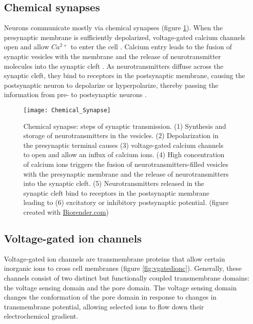\subsection{Chemical synapses}
Neurons communicate mostly via chemical synapses (figure  \ref{fig:chemicalsynapse}). When the presynaptic membrane is sufficiently depolarized, voltage-gated calcium channels open and allow $Ca^{2+}$ to enter the cell \parencite{Luo2020}. Calcium entry leads to the fusion of synaptic vesicles with the membrane and the release of neurotransmitter molecules into the synaptic cleft \parencite{Chapman2002}.  As neurotransmitters diffuse across the synaptic cleft, they bind to receptors in the postsynaptic membrane, causing the postsynaptic neuron to depolarize or hyperpolarize, thereby passing the information from pre- to postsynaptic neurons \parencite{Maio2008}. 

\begin{figure}
\centering
\hspace*{-1cm} 
\texttt{[image: Chemical\_Synapse]}
\caption[Chemical synapse: steps of synaptic transmission] {Chemical synapse: steps of synaptic transmission. (1) Synthesis and storage of neurotransmitters in the vesicles. (2) Depolarization in the presynaptic terminal causes (3) voltage-gated calcium channels to open and allow an influx of calcium ions. (4) High concentration of calcium ions triggers the fusion of neurotransmitters-filled vesicles with the presynaptic membrane and the release of neurotransmitters into the synaptic cleft. (5) Neurotransmitters released in the synaptic cleft bind to receptors in the postsynaptic membrane leading to (6) excitatory or inhibitory postsynaptic potential. (figure created with \href{https://app.biorender.com/biorender-templates}{Biorender.com})}
\label{fig:chemicalsynapse}
\end{figure}

\subsection{Voltage-gated ion channels}
Voltage-gated ion channels are transmembrane proteins that allow certain inorganic ions to cross cell membranes (figure  \ref{fig:vgatedionc}). Generally, these channels consist of two distinct but functionally coupled transmembrane domains: the voltage sensing domain and the pore domain. The voltage sensing domain changes the conformation of the pore domain in response to changes in transmembrane potential, allowing selected ions to flow down their electrochemical gradient. 


